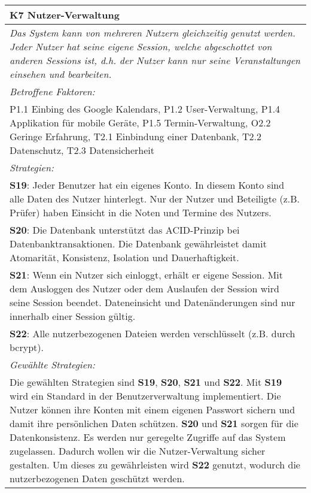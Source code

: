 {%
\begin{center}
\begin{minipage}{\linewidth}
    \centering
\renewcommand{\arraystretch}{1.5}
\begin{tabular}{|>{\centering\arraybackslash}p{15cm}|}
            \hline
           \textbf{K7 Nutzer-Verwaltung}\\ \hline
            \label{K7}
            \textit{Das System kann von mehreren Nutzern gleichzeitig genutzt werden. Jeder Nutzer hat seine eigene Session, welche abgeschottet von anderen Sessions ist, d.h. der Nutzer kann nur seine Veranstaltungen einsehen und bearbeiten.}\\ \hline
            \textit{Betroffene Faktoren:} \\
P1.1 Einbing des Google Kalendars, P1.2 User-Verwaltung, P1.4 Applikation für mobile Geräte, P1.5 Termin-Verwaltung,  O2.2 Geringe Erfahrung, T2.1 Einbindung einer Datenbank, T2.2 Datenschutz, T2.3 Datensicherheit 
 \\ \hline
	      \textit{Strategien:} \\
\textbf{S19}: Jeder Benutzer hat ein eigenes Konto. In diesem Konto sind alle Daten des Nutzer hinterlegt. Nur der Nutzer und Beteiligte (z.B. Prüfer) haben Einsicht in die Noten und Termine des Nutzers.\\
\textbf{S20}: Die  Datenbank unterstützt das ACID-Prinzip bei Datenbanktransaktionen. Die Datenbank gewährleistet damit Atomarität, Konsistenz, Isolation und Dauerhaftigkeit.\\
\textbf{S21}: Wenn ein Nutzer sich einloggt, erhält er eigene Session. Mit dem Ausloggen des Nutzer oder dem Auslaufen der Session wird seine Session beendet. Dateneinsicht und Datenänderungen sind nur innerhalb einer Session gültig.\\
\textbf{S22}: Alle nutzerbezogenen Dateien werden verschlüsselt (z.B. durch bcrypt).
\\  \hline
	      \textit{Gewählte Strategien:} \\ 
Die gewählten Strategien sind \textbf{S19}, \textbf{S20}, \textbf{S21} und \textbf{S22}. Mit \textbf{S19} wird ein Standard in der Benutzerverwaltung implementiert. Die Nutzer können ihre Konten mit einem eigenen Passwort sichern und damit ihre persönlichen Daten schützen. \textbf{S20} und \textbf{S21} sorgen für die Datenkonsistenz. Es werden nur geregelte Zugriffe auf das System zugelassen. Dadurch wollen wir die Nutzer-Verwaltung sicher gestalten. Um dieses zu gewährleisten wird \textbf{S22} genutzt, wodurch die nutzerbezogenen Daten geschützt werden.
 \\ \hline
        \end{tabular}
\end{minipage}
\end{center}

}
